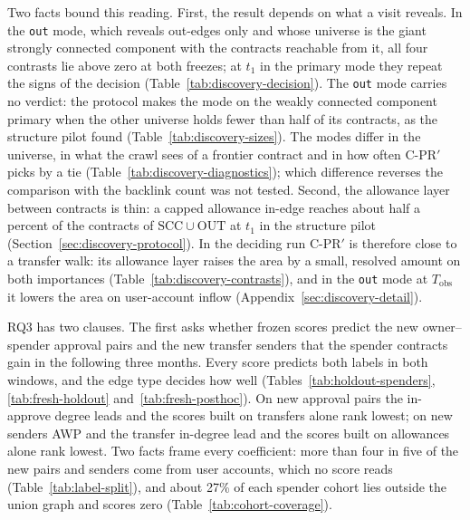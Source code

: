 Two facts bound this reading. First, the result depends on what a visit reveals. In the \texttt{out} mode, which reveals out-edges only and whose universe is the giant strongly connected component with the contracts reachable from it, all four contrasts lie above zero at both freezes; at $t_1$ in the primary mode they repeat the signs of the decision (Table~\ref{tab:discovery-decision}). The \texttt{out} mode carries no verdict: the protocol makes the mode on the weakly connected component primary when the other universe holds fewer than half of its contracts, as the structure pilot found (Table~\ref{tab:discovery-sizes}). The modes differ in the universe, in what the crawl sees of a frontier contract and in how often \mbox{C-PR}$'$ picks by a tie (Table~\ref{tab:discovery-diagnostics}); which difference reverses the comparison with the backlink count was not tested. Second, the allowance layer between contracts is thin: a capped allowance in-edge reaches about half a percent of the contracts of $\mathrm{SCC}\cup\mathrm{OUT}$ at $t_1$ in the structure pilot (Section~\ref{sec:discovery-protocol}). In the deciding run \mbox{C-PR}$'$ is therefore close to a transfer walk: its allowance layer raises the area by a small, resolved amount on both importances (Table~\ref{tab:discovery-contrasts}), and in the \texttt{out} mode at $T_{\mathrm{obs}}$ it lowers the area on user-account inflow (Appendix~\ref{sec:discovery-detail}).


RQ3 has two clauses. The first asks whether frozen scores predict the new owner--spender approval pairs and the new transfer senders that the spender contracts gain in the following three months. Every score predicts both labels in both windows, and the edge type decides how well (Tables~\ref{tab:holdout-spenders}, \ref{tab:fresh-holdout} and~\ref{tab:fresh-posthoc}). On new approval pairs the in-approve degree leads and the scores built on transfers alone rank lowest; on new senders AWP and the transfer in-degree lead and the scores built on allowances alone rank lowest. Two facts frame every coefficient: more than four in five of the new pairs and senders come from user accounts, which no score reads (Table~\ref{tab:label-split}), and about 27\% of each spender cohort lies outside the union graph and scores zero (Table~\ref{tab:cohort-coverage}).

